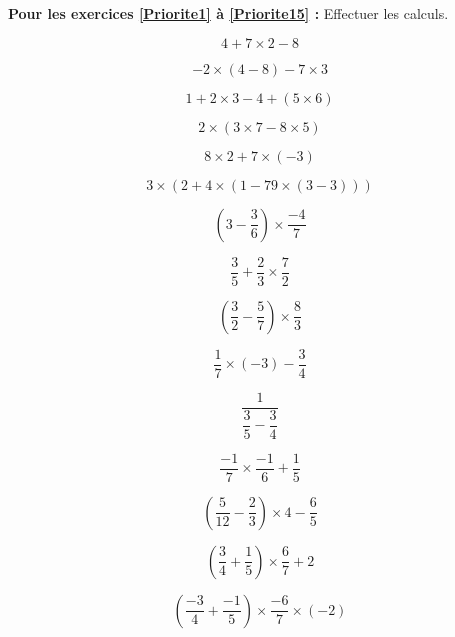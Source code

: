 \textbf{Pour les exercices \ref{Priorite1} à \ref{Priorite15} :} Effectuer les calculs.

\begin{multicols}{3}
    $$4+7\times 2 -8$$
      
    $$-2\times (4-8)-7\times 3$$
      
    $$1+2\times 3 -4+(5\times 6)$$
\end{multicols}

\begin{multicols}{3}
       
  $$2\times (3\times 7-8\times 5)$$
    
  $$8\times 2 +7 \times (-3)$$
    
    $$3\times (2+4\times (1-79\times (3-3)))$$
\end{multicols}

\begin{multicols}{3}
  $$(3-\dfrac{3}{6}) \times \dfrac{-4}{7} $$

  $$\dfrac{3}{5} + \dfrac{2}{3} \times \dfrac{7}{2}$$

  $$(\dfrac{3}{2} - \dfrac{5}{7}) \times \dfrac{8}{3}$$
\end{multicols}

\begin{multicols}{3}
  $$\dfrac{1}{7} \times(-3) - \dfrac{3}{4}$$
  
  $$\dfrac{1}{\dfrac{3}{5} - \dfrac{3}{4}}$$
    
  $$\dfrac{-1}{7} \times \dfrac{-1}{6} + \dfrac{1}{5}$$
\end{multicols}

\begin{multicols}{3}
  $$(\dfrac{5}{12} - \dfrac{2}{3})\times 4 - \dfrac{6}{5}$$
    
  $$(\dfrac{3}{4} + \dfrac{1}{5}) \times \dfrac{6}{7}+2$$
  
  $$(\dfrac{-3}{4} + \dfrac{-1}{5}) \times \dfrac{-6}{7}\times (-2)$$
\end{multicols}
